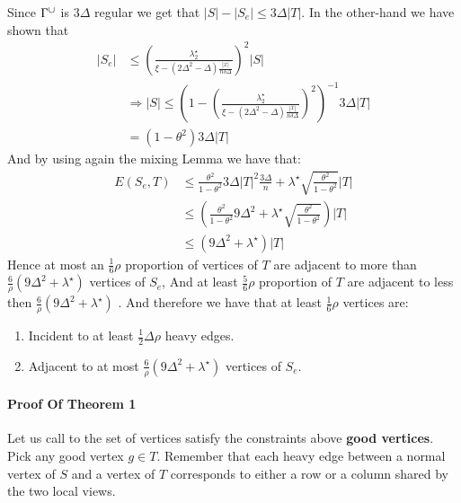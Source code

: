 \documentclass{article}
\begin{document}
\begin{multicols*}{2}
 Since $\Gamma^{\cup}$ is $3\Delta$ regular we get that $|S| - |S_{e}| \le 3\Delta |T| $. In the other-hand we have shown that 
 \begin{equation*}
   \begin{split}
     |S_{e}| & \le \left(\frac{\lambda^{\star}_{2}}{\xi - \left(2\Delta^{2} - \Delta  \right)\frac{|x|}{n \delta\Delta}}\right)^{2}|S| \\ &
     \Rightarrow |S| \le \left( 1 - \left(\frac{\lambda^{\star}_{2}}{\xi - \left(2\Delta^{2} - \Delta  \right)\frac{|x|}{n \delta\Delta}}\right)^{2}\right)^{-1}3\Delta|T| \\
     & = \left( 1 - \theta^2 \right) 3 \Delta |T|
   \end{split}
 \end{equation*}
 And by using again the mixing Lemma we have that: 
 \begin{equation*}
   \begin{split}
     E\left( S_{e},T \right) &\le \frac{\theta^2}{1- \theta^2}3\Delta|T|^2 \frac{3\Delta}{n} + \lambda^{\star}\sqrt{\frac{\theta^2}{1- \theta^2}}|T| \\ 
     & \le  \left( \frac{\theta^2}{1- \theta^2}9\Delta^{2} + \lambda^{\star}\sqrt{\frac{\theta^2}{1- \theta^2}}\right)|T| \\ 
     & \le \left(9\Delta^{2} + \lambda^{\star} \right) |T|
  \end{split}
 \end{equation*}
 Hence at most an $\frac{1}{6}\rho $ proportion of vertices of $T$ are adjacent to more than $\frac{6}{\rho} \left( 9\Delta^{2} + \lambda^{\star}  \right) $ vertices of $S_{e}$, And at least $\frac{5}{6}\rho$ proportion of $T$ are adjacent to less then $\frac{6}{\rho} \left( 9\Delta^{2} + \lambda^{\star}  \right) $ . 
 And therefore we have that at least $\frac{1}{6}\rho$ vertices are:
 \begin{enumerate}
   \item Incident to at least $\frac{1}{2}\Delta\rho$ heavy edges. 
   \item Adjacent to at most $ \frac{6}{\rho} \left( 9\Delta^{2} + \lambda^{\star}  \right)$ vertices of $S_{e}$.  
 \end{enumerate}
 \paragraph{Proof Of Theorem 1} Let us call to the set of vertices satisfy the constraints above \textbf{good vertices}. Pick any good vertex $g \in T$.
 Remember that each heavy edge between a normal vertex of $S$ and a vertex of $T$ corresponds to either a row or a column shared by the two local views.
 


\end{multicols*}
\end{document}
